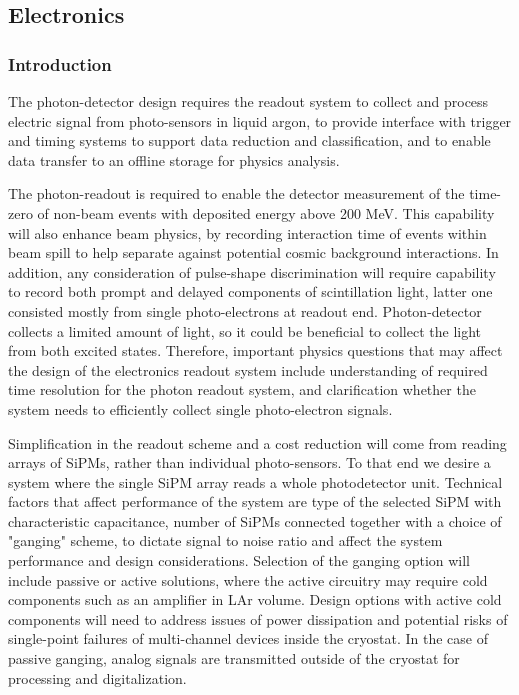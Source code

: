 

\subsection{Electronics}
\label{sec:fdsp-pd-pde}

\subsubsection{Introduction}

The photon-detector design requires the readout system to collect and process electric signal from photo-sensors in liquid argon, 
to provide interface with trigger and timing systems to support data reduction and classification, and to enable data transfer 
to an offline storage for physics analysis.

The photon-readout is required to enable the detector measurement of the time-zero of non-beam events with deposited 
energy above 200 MeV. This capability will also enhance beam physics, by recording interaction time of events within 
beam spill to help separate against potential cosmic background interactions. In addition, any consideration of pulse-shape 
discrimination will require capability to record both prompt and delayed components of scintillation light, latter one consisted mostly 
from single photo-electrons at readout end. Photon-detector collects a limited amount of light, so it could be beneficial to 
collect the light from both excited states. Therefore, important physics questions that may affect the design of the electronics 
readout system include understanding of required time resolution for the photon readout system, and clarification whether 
the system needs to efficiently collect single photo-electron signals. 

Simplification in the readout scheme and a cost reduction will come from reading arrays of SiPMs, rather than individual 
photo-sensors. To that end we desire a system where the single SiPM array reads a whole photodetector unit.
Technical factors that affect performance of the system are type of the selected SiPM with characteristic capacitance, 
number of SiPMs connected together with a choice of "ganging" scheme, to dictate signal to noise ratio and affect the system 
performance and design considerations. Selection of the ganging option will include passive or active solutions, where the active 
circuitry may require cold components such as an amplifier in LAr volume. Design options with active cold components will need 
to address issues of power dissipation and potential risks of single-point failures of multi-channel devices inside the cryostat.
In the case of passive ganging, analog signals are transmitted outside of the cryostat for processing and digitalization. 

